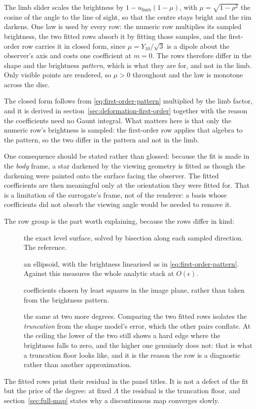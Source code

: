The limb slider scales the brightness by $1 - u_\text{limb}(1-\mu)$, with
$\mu = \sqrt{1-\rho^2}$ the cosine of the angle to the line of sight, so that the centre stays
bright and the rim darkens.  One law is used by every row: the numeric row multiplies its
sampled brightness, the two fitted rows absorb it by fitting those samples, and the
first-order row carries it in closed form, since $\mu = Y_{10}/\sqrt3$ is a dipole
about the observer's axis and costs one coefficient at $m = 0$.  The rows therefore differ in
the shape and the brightness \emph{pattern}, which is what they are for, and not in the limb.
Only visible points are rendered, so $\mu > 0$ throughout and the law is monotone across the
disc.

The closed form follows from \eqref{eq:first-order-pattern} multiplied by the limb factor, and
it is derived in section~\ref{sec:deformation-first-order} together with the reason the
coefficients need no Gaunt integral.  What matters here is that only the numeric row's
brightness is sampled: the first-order row applies that algebra to the pattern, so the two
differ in the pattern and not in the limb.

One consequence should be stated rather than glossed: because the fit is made in the
\emph{body} frame, a star darkened by the viewing geometry is fitted as though the darkening
were painted onto the surface facing the observer.  The fitted coefficients are then
meaningful only at the orientation they were fitted for.  That is a limitation of the
surrogate's frame, not of the renderer: a basis whose coefficients did not absorb the viewing
angle would be needed to remove it.

The row group is the part worth explaining, because the rows differ in kind:
\begin{description}
\item[] the exact level surface, solved by bisection along each sampled
  direction.  The reference.
\item[] an ellipsoid, with the brightness linearised as in
  \eqref{eq:first-order-pattern}.  Against  this measures the whole analytic
  stack at $O(\epsilon)$.
\item[] coefficients chosen by least squares in the image plane,
  rather than taken from the brightness pattern.
\item[] the same at two more degrees.  Comparing the two fitted
  rows isolates the \emph{truncation} from the shape model's error, which the other pairs
  conflate.  At the ceiling the lower of the two still shows a hard edge where the brightness
  falls to zero, and the higher one genuinely does not: that is what a truncation floor looks
  like, and it is the reason the row is a diagnostic rather than another approximation.
\end{description}
The fitted rows print their residual in the panel titles.  It is not a defect of the fit but
the price of the degree: at fixed $\Lambda$ the residual is the truncation floor, and
section~\ref{sec:full-map} states why a discontinuous map converges slowly.


